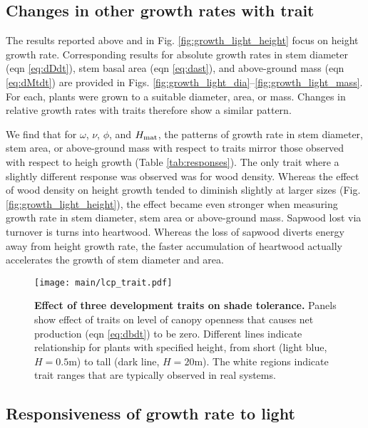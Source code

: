 \documentclass[9pt,twocolumn,twoside]{pnas-new}
\begin{document}
\subsection{Changes in other growth rates with trait}

The results reported above and in Fig. \ref{fig:growth_light_height} focus on height growth rate. Corresponding results for absolute growth rates in stem diameter (eqn \ref{eq:dDdt}), stem basal area (eqn \ref{eq:dast}), and above-ground mass (eqn \ref{eq:dMtdt}) are provided in Figs. \ref{fig:growth_light_dia}--\ref{fig:growth_light_mass}. For each, plants were grown to a suitable diameter, area, or mass. Changes in relative growth rates with traits therefore show a similar pattern.

We find that for $\omega$, $\nu$, $\phi$, and $H_{\rm mat}$, the patterns of growth rate in stem diameter, stem area, or above-ground mass with respect to traits mirror those observed with respect to heigh growth (Table \ref{tab:responses}). The only trait where a slightly different response was observed was for wood density. Whereas the effect of wood density on height growth tended to diminish slightly at larger sizes (Fig. \ref{fig:growth_light_height}), the effect became even stronger when measuring growth rate in stem diameter, stem area or above-ground mass. Sapwood lost via turnover is turns into heartwood. Whereas the loss of sapwood diverts energy away from height growth rate, the faster accumulation of heartwood actually accelerates the growth of stem diameter and area.

\begin{SCfigure*}[\sidecaptionrelwidth][b]
\centering
\texttt{[image: main/lcp\_trait.pdf]}
\caption{\textbf{Effect of three development traits on shade tolerance.}
Panels show effect of traits on level of canopy openness that causes net production (eqn \ref{eq:dbdt}) to be zero. Different lines indicate relationship for plants with specified height, from short (light blue,  $H=0.5$m) to tall (dark line, $H=20$m). The white regions indicate trait ranges that are typically observed in real systems.
\label{fig:wplcp}}
\end{SCfigure*}

\subsection{Responsiveness of growth rate to light}
\end{document}
